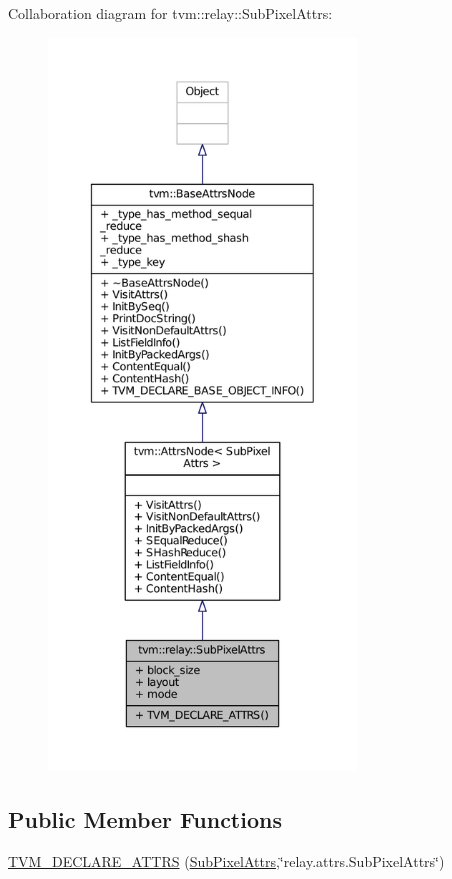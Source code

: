 Collaboration diagram for tvm\+:\+:relay\+:\+:Sub\+Pixel\+Attrs\+:
\nopagebreak
\begin{figure}[H]
\begin{center}
\leavevmode
\includegraphics[height=550pt]{structtvm_1_1relay_1_1SubPixelAttrs__coll__graph}
\end{center}
\end{figure}
\subsection*{Public Member Functions}
\begin{DoxyCompactItemize}
\item 
\hyperlink{structtvm_1_1relay_1_1SubPixelAttrs_ab84b355298ad1ba5c2a34d8779ed069f}{T\+V\+M\+\_\+\+D\+E\+C\+L\+A\+R\+E\+\_\+\+A\+T\+T\+RS} (\hyperlink{structtvm_1_1relay_1_1SubPixelAttrs}{Sub\+Pixel\+Attrs},\char`\"{}relay.\+attrs.\+Sub\+Pixel\+Attrs\char`\"{})
\end{DoxyCompactItemize}
